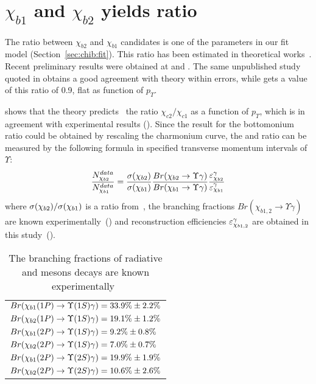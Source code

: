 \section{\texorpdfstring{$\chi_{b1}$}{chib1} and \texorpdfstring{$\chi_{b2}$}{chib2} yields ratio}
\label{sec:ratio}

The ratio between $\chi_{b2}$ and $\chi_{b1}$ candidates is one of the
parameters in our fit model (Section~\ref{sec:chib:fit}). This ratio
has been estimated in theoretical works~\cite{Likhoded:2012hw}. Recent preliminary results were
obtained at \lhcb and \cms. The same unpublished \lhcb study quoted in  
obtains a good agreement with theory within errors,
while \cms\cite{CMS-PAS-BPH-13-005} gets a value of this ratio of 0.9, flat as function of $p_T$. 

 shows that the theory
predicts~\cite{Likhoded:2012hw} the ratio $\chi_{c2}/\chi_{c1}$ as a function
of $p_T$, which is in agreement with experimental results ().
Since the result for the bottomonium ratio could be obtained by rescaling the
charmonium curve, the  \chibone and \chibtwo ratio can be  measured by the
following formula in specified transverse momentum intervals of $\Upsilon$:
\begin{equation}
    \frac{N_{\chi_{{b} 2}}^{data}}{N_{\chi_{{b} 1}}^{data}} = \frac{\sigma(\chi_{{b} 2})}{\sigma(\chi_{{b} 1})}
    \frac{Br(\chi_{{b} 2}\rightarrow\Upsilon\gamma)}{Br(\chi_{{b} 1}\rightarrow\Upsilon\gamma)}\frac{{\varepsilon}_{\chi_{{b} 2}}^{\gamma}}{{\varepsilon}_{\chi_{{b} 1}}^{\gamma}}
\label{eqn:mc_ratio}
\end{equation}
\noindent where $\sigma(\chi_{{b} 2}) / \sigma(\chi_{{b} 1})$ is a ratio
from~\cite{Likhoded:2012hw}, the branching fractions $Br(\chi_{b1,2} \to \Upsilon \gamma)$ 
are known experimentally~() and reconstruction efficiencies 
${\varepsilon}_{\chi_{b1,2}}^{\gamma}$ are obtained in this study~().

\begin{table}[H]
\caption{The branching fractions of radiative \chibOneP and \chibTwoP mesons
decays are known experimentally~\cite{PDG2012}}
\centering
\begin{tabular}{l}
$Br(\chiboneOneP \to \Y1S \gamma) = 33.9\% \pm 2.2\%$ \\
$Br(\chibtwoOneP \to \Y1S \gamma) = 19.1\% \pm 1.2\%$ \\
$Br(\chiboneTwoP \to \Y1S \gamma) = 9.2\% \pm 0.8\%$ \\
$Br(\chibtwoTwoP \to \Y1S \gamma)  = 7.0\% \pm 0.7\%$ \\
$Br(\chiboneTwoP \to \Y2S \gamma) = 19.9\% \pm 1.9\%$ \\
$Br(\chibtwoTwoP \to \Y2S \gamma) = 10.6\% \pm 2.6\%$ \\
\end{tabular}
\label{tab:branching}
\end{table}

